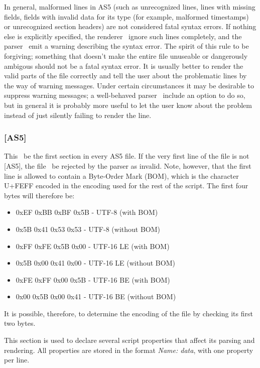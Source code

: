 \documentclass{spec}
\begin{document}
In general, malformed lines in AS5 (such as unrecognized lines, lines with missing fields, fields
with invalid data for its type (for example, malformed timestamps) or unrecognized section headers)
are not considered fatal syntax errors. If nothing else is explicitly specified, the renderer \must\
ignore such lines completely, and the parser \should\ emit a warning describing the syntax error. The
spirit of this rule to be forgiving; something that doesn't make the entire file unuseable or dangerously
ambigous should not be a fatal syntax error. It is usually better to render the valid parts of the file
correctly and tell the user about the problematic lines by the way of warning messages. Under certain
circumstances it may be desirable to suppress warning messages; a well-behaved parser \should\ include
an option to do so, but in general it is probably more useful to let the user know about the problem
instead of just silently failing to render the line.

\subsubsection{[AS5]}
This \must\ be the first section in every AS5 file. If the very first line of the file is not
[AS5], the file \must\ be rejected by the parser as invalid. Note, however, that the first
line is allowed to contain a Byte-Order Mark (BOM), which is the character U+FEFF encoded in
the encoding used for the rest of the script\cite{Unicode BOM}. The first four bytes will therefore be:

\begin{itemize}
\item 0xEF 0xBB 0xBF 0x5B - UTF-8 (with BOM)
\item 0x5B 0x41 0x53 0x53 - UTF-8 (without BOM)
\item 0xFF 0xFE 0x5B 0x00 - UTF-16 LE (with BOM)
\item 0x5B 0x00 0x41 0x00 - UTF-16 LE (without BOM)
\item 0xFE 0xFF 0x00 0x5B - UTF-16 BE (with BOM)
\item 0x00 0x5B 0x00 0x41 - UTF-16 BE (without BOM)
\end{itemize}

It is possible, therefore, to determine the encoding of the file by checking its first two bytes.

This section is used to declare several script properties that affect its parsing and rendering.
All properties are stored in the format \textit{Name: data}, with one property per line.
\end{document}
